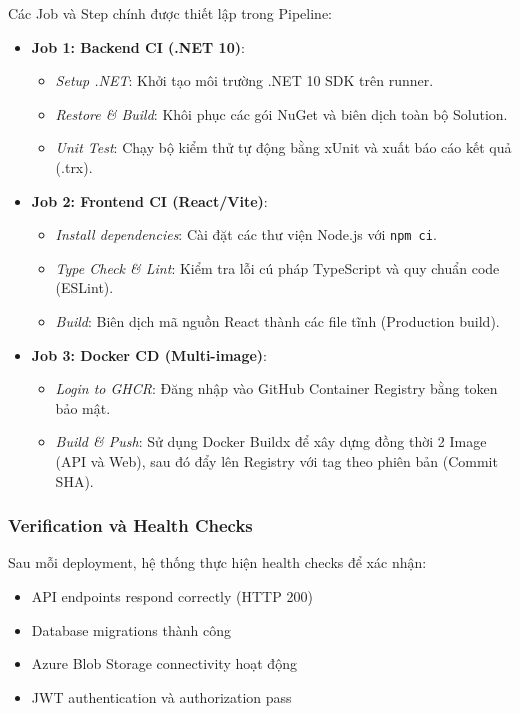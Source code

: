 \documentclass[a4paper]{article}
\begin{document}
    Các Job và Step chính được thiết lập trong Pipeline:
    \begin{itemize}
        \item \textbf{Job 1: Backend CI (.NET 10)}:
        \begin{itemize}
            \item \textit{Setup .NET}: Khởi tạo môi trường .NET 10 SDK trên runner.
            \item \textit{Restore \& Build}: Khôi phục các gói NuGet và biên dịch toàn bộ Solution.
            \item \textit{Unit Test}: Chạy bộ kiểm thử tự động bằng xUnit và xuất báo cáo kết quả (.trx).
        \end{itemize}
        \item \textbf{Job 2: Frontend CI (React/Vite)}:
        \begin{itemize}
            \item \textit{Install dependencies}: Cài đặt các thư viện Node.js với \texttt{npm ci}.
            \item \textit{Type Check \& Lint}: Kiểm tra lỗi cú pháp TypeScript và quy chuẩn code (ESLint).
            \item \textit{Build}: Biên dịch mã nguồn React thành các file tĩnh (Production build).
        \end{itemize}
        \item \textbf{Job 3: Docker CD (Multi-image)}:
        \begin{itemize}
            \item \textit{Login to GHCR}: Đăng nhập vào GitHub Container Registry bằng token bảo mật.
            \item \textit{Build \& Push}: Sử dụng Docker Buildx để xây dựng đồng thời 2 Image (API và Web), sau đó đẩy lên Registry với tag theo phiên bản (Commit SHA).
        \end{itemize}
    \end{itemize}

    \subsubsection{Verification và Health Checks}
    Sau mỗi deployment, hệ thống thực hiện health checks để xác nhận:
    \begin{itemize}
        \item API endpoints respond correctly (HTTP 200)
        \item Database migrations thành công
        \item Azure Blob Storage connectivity hoạt động
        \item JWT authentication và authorization pass
    \end{itemize}
\end{document}
